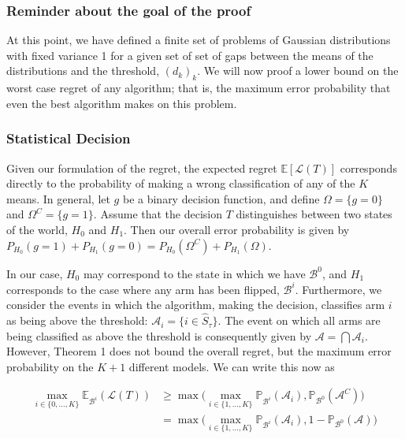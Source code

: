 \documentclass[12pt,]{article}
\begin{document}
\subsubsection{Reminder about the goal of the
proof}\label{reminder-about-the-goal-of-the-proof}

At this point, we have defined a finite set of problems of Gaussian
distributions with fixed variance 1 for a given set of set of gaps
between the means of the distributions and the threshold, \((d_k)_k\).
We will now proof a lower bound on the worst case regret of any
algorithm; that is, the maximum error probability that even the best
algorithm makes on this problem.

\subsubsection{Statistical Decision}\label{statistical-decision}

Given our formulation of the regret, the expected regret
\(\mathbb{E}[\mathcal{L}(T)]\) corresponds directly to the probability
of making a wrong classification of any of the \(K\) means. In general,
let \(g\) be a binary decision function, and define
\(\Omega = \{g = 0\}\) and \(\Omega^C = \{g = 1\}\). Assume that the
decision \(T\) distinguishes between two states of the world, \(H_0\)
and \(H_1\). Then our overall error probability is given by
\(P_{H_0}(g=1) + P_{H_1}(g = 0) = P_{H_0}(\Omega^C) + P_{H_1}(\Omega)\).

In our case, \(H_0\) may correspond to the state in which we have
\(\mathcal{B}^0\), and \(H_1\) corresponds to the case where any arm has
been flipped, \(\mathcal{B}^i\). Furthermore, we consider the events in
which the algorithm, making the decision, classifies arm \(i\) as being
above the threshold: \(\mathcal{A}_i = \{i \in \hat{S}_\tau\}\). The
event on which all arms are being classified as above the threshold is
consequently given by \(\mathcal{A} = \bigcap \mathcal{A}_i\). However,
Theorem 1 does not bound the overall regret, but the maximum error
probability on the \(K+1\) different models. We can write this now as

\begin{align}
\max_{i \in \{0, \dots, K\}} \mathbb{E}_{\mathcal{B}^i} (\mathcal{L}(T)) & \geq \max \big( \max_{i \in \{1, \dots, K\}} \mathbb{P}_{\mathcal{B}^i}(\mathcal{A}_i), \mathbb{P}_{\mathcal{B}^0}(\mathcal{A}^C) \big) \\
& = \max \big( \max_{i \in \{1, \dots, K\}} \mathbb{P}_{\mathcal{B}^i}(\mathcal{A}_i), 1 - \mathbb{P}_{\mathcal{B}^0}(\mathcal{A}) \big) \label{LocatelliTheorem1ExpRegret}
\end{align}
\end{document}
